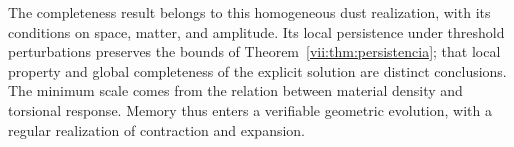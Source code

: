 The completeness result belongs to this homogeneous dust realization,
with its conditions on space, matter, and amplitude. Its
local persistence under threshold perturbations preserves the bounds
of Theorem~\ref{vii:thm:persistencia}; that local property and
global completeness of the explicit solution are distinct conclusions.
The minimum scale comes from the relation between material density
and torsional response. Memory thus enters a verifiable geometric
evolution, with a regular realization of contraction
and expansion.

